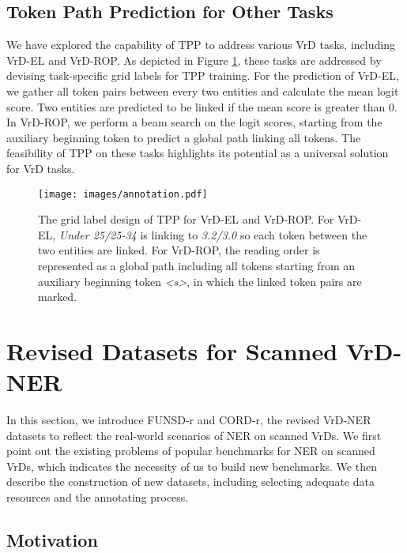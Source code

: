 \documentclass[11pt]{article}
\begin{document}
\subsection{Token Path Prediction for Other Tasks}

We have explored the capability of TPP to address various VrD tasks, including VrD-EL and VrD-ROP. 
As depicted in Figure \ref{fig:annotation}, these tasks are addressed by devising task-specific grid labels for TPP training. 
For the prediction of VrD-EL, we gather all token pairs between every two entities and calculate the mean logit score. Two entities are predicted to be linked if the mean score is greater than 0. 
In VrD-ROP, we perform a beam search on the logit scores, starting from the auxiliary beginning token to predict a global path linking all tokens. 
The feasibility of TPP on these tasks highlights its potential as a universal solution for VrD tasks.

\begin{figure}[t]
    \centering
\texttt{[image: images/annotation.pdf]}        
    \caption{
        The grid label design of TPP for VrD-EL and VrD-ROP. For VrD-EL, {\footnotesize \textit{Under 25/25-34}} is linking to {\footnotesize \textit{3.2/3.0}} so each token between the two entities are linked. For VrD-ROP, the reading order is represented as a global path including all tokens starting from an auxiliary beginning token \textit{<s>}, in which the linked token pairs are marked. }
\label{fig:annotation}
\end{figure}

\section{Revised Datasets for Scanned VrD-NER}

In this section, we introduce FUNSD-r and CORD-r, the revised VrD-NER datasets to reflect the real-world scenarios of NER on scanned VrDs. 
We first point out the existing problems of popular benchmarks for NER on scanned VrDs, which indicates the necessity of us to build new benchmarks. 
We then describe the construction of new datasets, including selecting adequate data resources and the annotating process.  


\subsection{Motivation}
\end{document}

